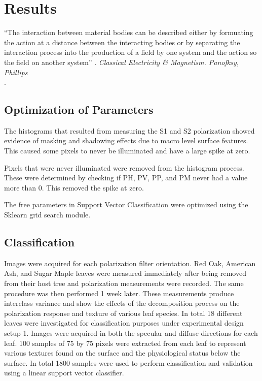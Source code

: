 \chapter{Results}
\begin{center}
  \begin{minipage}{0.75\textwidth}
    \begin{small}
      “The interaction between material bodies can be described either by formuating the action at a distance between the interacting bodies or by separating the interaction process into the production of a field by one system and the action so the field on another system” .
      \emph{Classical Electricity \& Magnetism. Panofksy, Phillips}\\.
    \end{small}
  \end{minipage}
  \vspace{0.5cm}
\end{center}

\section{Optimization of Parameters}
The histograms that resulted from measuring the S1 and S2 polarization showed evidence of masking and shadowing effects due to macro level surface features.  This caused some pixels to never be illuminated and have a large spike at zero.

Pixels that were never illuminated were removed from the histogram process. These were determined by checking if PH, PV, PP, and PM never had a value more than 0.  This removed the spike at zero.

The free parameters in Support Vector Classification were optimized using the Sklearn grid search module.

\section{Classification}
Images were acquired for each polarization filter orientation. Red Oak, American Ash, and Sugar Maple leaves were measured immediately after being removed from their host tree and polarization measurements were recorded.  The same procedure was then performed 1 week later.  These measurements produce interclass variance and show the effects of the decomposition process on the polarization response and texture of various leaf species.  In total 18 different leaves were investigated for classification purposes under experimental design setup 1.  Images were acquired in both the specular and diffuse directions for each leaf.  100 samples of 75 by 75 pixels were extracted from each leaf to represent various textures found on the surface and the physiological status below the surface.  In total 1800 samples were used to perform classification and validation using a linear support vector classifier.
